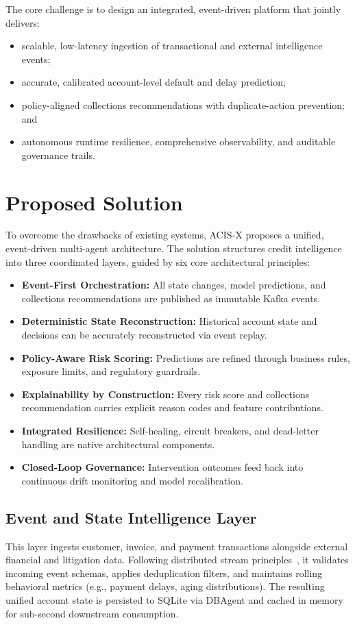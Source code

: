 \documentclass[a4paper, 12pt]{report}
\begin{document}
The core challenge is to design an integrated, event-driven platform that jointly delivers:
\begin{itemize}[itemsep=2pt]
    \item scalable, low-latency ingestion of transactional and external intelligence events;
    \item accurate, calibrated account-level default and delay prediction;
    \item policy-aligned collections recommendations with duplicate-action prevention; and
    \item autonomous runtime resilience, comprehensive observability, and auditable governance trails.
\end{itemize}

\section{Proposed Solution}
To overcome the drawbacks of existing systems, ACIS-X proposes a unified, event-driven multi-agent architecture. The solution structures credit intelligence into three coordinated layers, guided by six core architectural principles:
\begin{itemize}[itemsep=2pt]
    \item \textbf{Event-First Orchestration:} All state changes, model predictions, and collections recommendations are published as immutable Kafka events.
    \item \textbf{Deterministic State Reconstruction:} Historical account state and decisions can be accurately reconstructed via event replay.
    \item \textbf{Policy-Aware Risk Scoring:} Predictions are refined through business rules, exposure limits, and regulatory guardrails.
    \item \textbf{Explainability by Construction:} Every risk score and collections recommendation carries explicit reason codes and feature contributions.
    \item \textbf{Integrated Resilience:} Self-healing, circuit breakers, and dead-letter handling are native architectural components.
    \item \textbf{Closed-Loop Governance:} Intervention outcomes feed back into continuous drift monitoring and model recalibration.
\end{itemize}

\subsection{Event and State Intelligence Layer}
This layer ingests customer, invoice, and payment transactions alongside external financial and litigation data. Following distributed stream principles~\cite{zaharia2013discretized,akidau2015dataflow}, it validates incoming event schemas, applies deduplication filters, and maintains rolling behavioral metrics (e.g., payment delays, aging distributions). The resulting unified account state is persisted to SQLite via DBAgent and cached in memory for sub-second downstream consumption.
\end{document}
